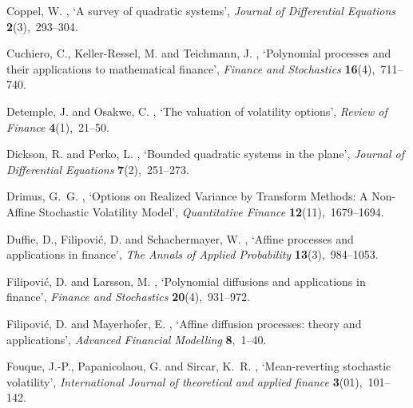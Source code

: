 \documentclass[11pt,a4paper] {article}
\begin{document}
\begin{thebibliography}{}
Coppel, W.  \harvardyearright , `A survey of quadratic
  systems', {\em Journal of Differential Equations} {\bf 2}(3),~293--304.


Cuchiero, C., Keller-Ressel, M. and Teichmann, J.  \harvardyearright , `Polynomial processes and their applications to
  mathematical finance', {\em Finance and Stochastics} {\bf 16}(4),~711--740.


Detemple, J. and Osakwe, C.  \harvardyearright ,
  `The valuation of volatility options', {\em Review of Finance} {\bf
  4}(1),~21--50.

Dickson, R. and Perko, L.  \harvardyearright ,
  `Bounded quadratic systems in the plane', {\em Journal of Differential
  Equations} {\bf 7}(2),~251--273.

Drimus, G.~G.  \harvardyearright, `Options on Realized Variance by Transform Methods: A Non-Affine Stochastic Volatility Model',
{\em Quantitative Finance} {\bf 12}(11),~1679--1694.

Duffie, D., Filipovi{\'c}, D. and Schachermayer, W.  \harvardyearright , `Affine processes and applications in finance', {\em
  The Annals of Applied Probability} {\bf 13}(3),~984--1053.


Filipovi{\'c}, D. and Larsson, M.  \harvardyearright , `Polynomial diffusions and applications in finance',
  {\em Finance and Stochastics} {\bf 20}(4),~931--972.

Filipovi{\'c}, D. and Mayerhofer, E.  \harvardyearright , `Affine diffusion processes: theory and
  applications', {\em Advanced Financial Modelling} {\bf 8},~1--40.

Fouque, J.-P., Papanicolaou, G. and Sircar, K.~R.  \harvardyearright , `Mean-reverting stochastic volatility', {\em
  International Journal of theoretical and applied finance} {\bf
  3}(01),~101--142.


\end{thebibliography}
\end{document}
